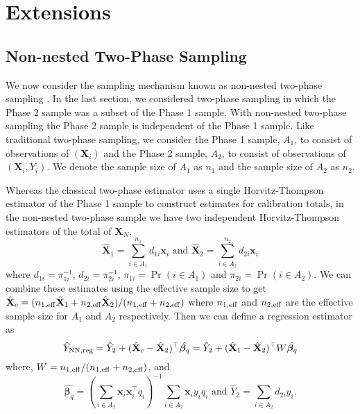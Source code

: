 \documentclass[12pt]{article}
\renewcommand{\bf}[1]{\mathbf{#1}}
\begin{document}
\section{Extensions}

\subsection{Non-nested Two-Phase Sampling}

We now consider the sampling mechanism known as non-nested two-phase sampling 
\citep{hidiroglou2001double}. In the last section, we considered two-phase sampling
in which the Phase 2 sample was a subset of the Phase 1 sample. With non-nested
two-phase sampling the Phase 2 sample is independent of the Phase 1 sample. 
Like traditional two-phase sampling, we consider the Phase 1 sample, $A_1$, to
consist of observations of $(\bf X_i)$ and the Phase 2 sample,
$A_2$, to consist of observations of $(\bf X_i, Y_i)$. We denote the sample size
of $A_1$ as $n_1$ and the sample size of $A_2$ as $n_2$.

Whereas the classical two-phase estimator uses a single Horvitz-Thompson
estimator of the Phase 1 sample to construct estimates for calibration totals,
in the non-nested two-phase sample we have two independent Horvitz-Thompson
estimators of the total of $\bf X_N$,
$$\hat{\bf X}_1 = \sum_{i \in A_1}^{n_1} d_{1i} \bf x_i \text{ and } 
\hat{\bf X}_2 = \sum_{i \in A_2}^{n_2} d_{2i} \bf x_i $$
where $d_{1i} = \pi_{1i}^{-1}$, $d_{2i} = \pi_{2i}^{-1}$, 
$\pi_{1i} = \Pr(i \in A_1)$ and $\pi_{2i} = \Pr(i \in A_2)$. 
We can combine these estimates using the effective sample size 
\citep{kish1965survey} to get
$\hat{\bf X}_c = (n_{1, \rm{eff}} \hat{\bf X}_1 + n_{2, \rm{eff}}\hat{\bf X}_2) / 
(n_{1, \rm{eff}} + n_{2, \rm{eff}})$ where $n_{1, \rm{eff}}$ and 
$n_{2, \rm{eff}}$ are the effective sample size for $A_1$ and $A_2$ respectively.
Then we can define a regression estimator as
\begin{equation}\label{eq:nntpreg}
\hat Y_{\rm NN, reg} = 
\hat Y_2 + (\hat{\bf X}_c - \hat{\bf X}_2)^\top \hat{\bm \beta_q} = 
\hat Y_2 + (\hat{\bf X}_1 - \hat{\bf X}_2)^\top W\hat{\bm \beta_q}
\end{equation}
where, $W = n_{1, \rm{eff}} / (n_{1, \rm{eff}} + n_{2, \rm{eff}})$, and
$$
\hat{\bm \beta_q} = 
\left(\sum_{i \in A_2} \bf x_i \bf x_i^\top q_i\right)^{-1} 
\sum_{i \in A_2} \bf x_i y_i q_i \text{ and }
\hat Y_2 = \sum_{i \in A_2} d_{2i} y_i.
$$
\end{document}
